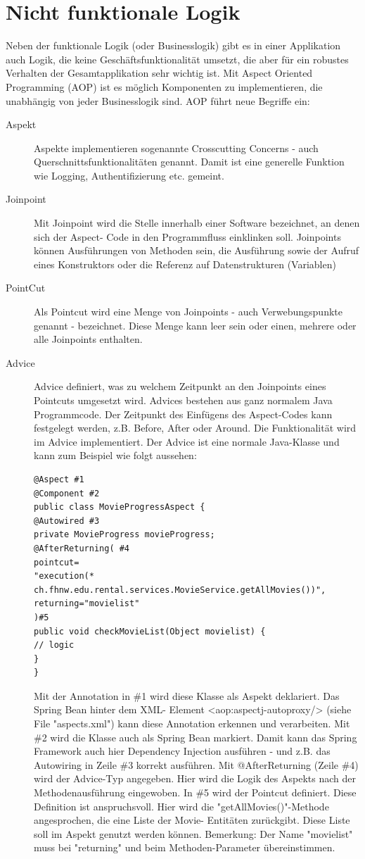 \documentclass[a4paper,10pt]{scrreprt}
\begin{document}
\section{Nicht funktionale Logik}
Neben der funktionale Logik (oder Businesslogik) gibt es in einer Applikation auch Logik, die keine
Geschäftsfunktionalität umsetzt, die aber für ein robustes Verhalten der Gesamtapplikation sehr
wichtig ist. Mit Aspect Oriented Programming (AOP) ist es möglich Komponenten zu
implementieren, die unabhängig von jeder Businesslogik sind.
AOP führt neue Begriffe ein:
\begin{description}
 \item [Aspekt] Aspekte implementieren sogenannte Crosscutting Concerns - auch
Querschnittsfunktionalitäten genannt. Damit ist eine generelle Funktion wie Logging,
Authentifizierung etc. gemeint.
\item[Joinpoint] Mit Joinpoint wird die Stelle innerhalb einer Software bezeichnet, an denen sich der Aspect-
Code in den Programmfluss einklinken soll. Joinpoints können Ausführungen von Methoden
sein, die Ausführung sowie der Aufruf eines Konstruktors oder die Referenz auf
Datenstrukturen (Variablen)
\item[PointCut] Als Pointcut wird eine Menge von Joinpoints - auch Verwebungspunkte genannt - bezeichnet.
Diese Menge kann leer sein oder einen, mehrere oder alle Joinpoints enthalten. 
\item[Advice] Advice definiert, was zu welchem Zeitpunkt an den Joinpoints eines Pointcuts umgesetzt wird.
Advices bestehen aus ganz normalem Java Programmcode. Der Zeitpunkt des Einfügens des
Aspect-Codes kann festgelegt werden, z.B. Before, After oder Around.
Die Funktionalität wird im Advice implementiert. Der Advice ist eine normale Java-Klasse und kann
zum Beispiel wie folgt aussehen:
\begin{lstlisting}
@Aspect #1
@Component #2
public class MovieProgressAspect {
@Autowired #3
private MovieProgress movieProgress;
@AfterReturning( #4
pointcut=
"execution(* ch.fhnw.edu.rental.services.MovieService.getAllMovies())",
returning="movielist"
)#5
public void checkMovieList(Object movielist) {
// logic
}
}
\end{lstlisting}
Mit der Annotation in \#1 wird diese Klasse als Aspekt deklariert. Das Spring Bean hinter dem XML-
Element <aop:aspectj-autoproxy/> (siehe File "aspects.xml") kann diese Annotation erkennen und
verarbeiten. Mit \#2 wird die Klasse auch als Spring Bean markiert. Damit kann das Spring
Framework auch hier Dependency Injection ausführen - und z.B. das Autowiring in Zeile \#3 korrekt
ausführen.
Mit @AfterReturning (Zeile \#4) wird der Advice-Typ angegeben. Hier wird die Logik des Aspekts
nach der Methodenausführung eingewoben. In \#5 wird der Pointcut definiert. Diese Definition ist
anspruchsvoll. Hier wird die "getAllMovies()"-Methode angesprochen, die eine Liste der Movie-
Entitäten zurückgibt. Diese Liste soll im Aspekt genutzt werden können.
Bemerkung: Der Name "movielist" muss bei "returning" und beim Methoden-Parameter
übereinstimmen.
\end{description}
\end{document}
